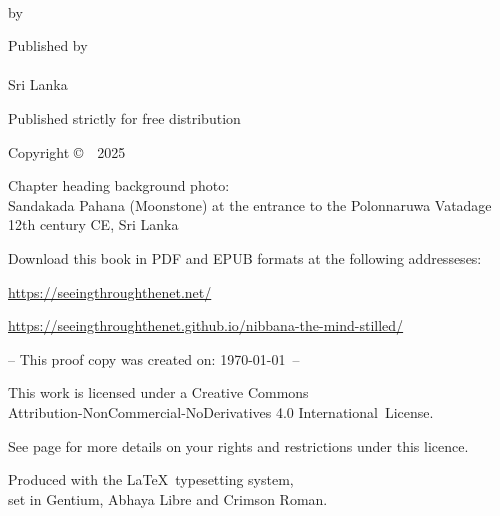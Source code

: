 \cleartoverso
\thispagestyle{empty}

{\copyrightsize
\centering
\setlength{\parindent}{0pt}%
\setlength{\parskip}{0.8\baselineskip}%

\thetitle\\
\thesubtitle

\ifthenelse{\equal{}{\theVolumeTitle}}{}{\textbf{\theVolumeTitle}}{}

by \theauthor

Published by\\
\thePublisher\\
Sri Lanka

Published strictly for free distribution


Copyright \copyright\ \thePublisher\ 2025

Chapter heading background photo:\\
Sandakada Pahana (Moonstone) at the entrance to the Polonnaruwa Vatadage\\
12th century CE, Sri Lanka

Download this book in PDF and EPUB formats at the following addresseses:

\href{https://seeingthroughthenet.net/}{https://seeingthroughthenet.net/}

\href{https://seeingthroughthenet.github.io/nibbana-the-mind-stilled/}{https://seeingthroughthenet.github.io/nibbana-the-mind-stilled/}

\vfill

-- This proof copy was created on: \today\ --

\vfill

{\footnotesize

This work is licensed under a Creative Commons\\
Attribution-NonCommercial-NoDerivatives 4.0 International~License.

See page \pageref{copyright-details} for more details on your rights and restrictions under this licence.

Produced with the \LaTeX\ typesetting system,\\ set in Gentium, Abhaya Libre and Crimson Roman.

\theEditionInfo

}}
